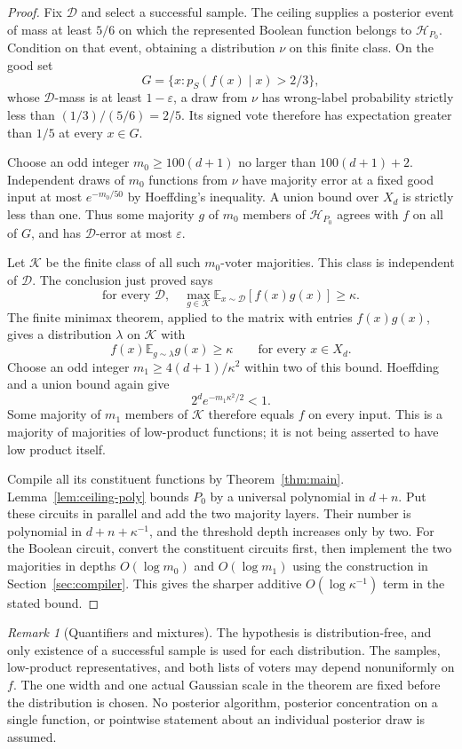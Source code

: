 \documentclass[11pt]{article}
\theoremstyle{remark}
\newtheorem{remark}[theorem]{Remark}
\newcommand{\E}{\mathbb E}
\begin{document}
\begin{proof}
Fix $\mathcal D$ and select a successful sample. The ceiling supplies
a posterior event of mass at least $5/6$ on which the represented
Boolean function belongs to $\mathcal H_{P_0}$. Condition on that
event, obtaining a distribution $\nu$ on this finite class. On the
good set
\[
 G=\{x:p_S(f(x)\mid x)>2/3\},
\]
whose $\mathcal D$-mass is at least $1-\varepsilon$, a draw from
$\nu$ has wrong-label probability strictly less than
$(1/3)/(5/6)=2/5$. Its signed vote therefore has expectation greater
than $1/5$ at every $x\in G$.

Choose an odd integer $m_0\ge100(d+1)$ no larger than $100(d+1)+2$.
Independent draws of $m_0$ functions from $\nu$ have majority error
at a fixed good input at most $e^{-m_0/50}$ by Hoeffding's inequality.
A union bound over $X_d$ is strictly less than one. Thus some majority
$g$ of $m_0$ members of $\mathcal H_{P_0}$ agrees with $f$ on all of
$G$, and has $\mathcal D$-error at most $\varepsilon$.

Let $\mathcal K$ be the finite class of all such $m_0$-voter
majorities. This class is independent of $\mathcal D$. The conclusion
just proved says
\[
 \text{for every }\mathcal D,\quad
 \max_{g\in\mathcal K}\E_{x\sim\mathcal D}[f(x)g(x)]\ge\kappa.
\]
The finite minimax theorem, applied to the matrix with entries
$f(x)g(x)$, gives a distribution $\lambda$ on $\mathcal K$ with
\[
 f(x)\E_{g\sim\lambda}g(x)\ge\kappa
 \qquad\text{for every }x\in X_d.
\]
Choose an odd integer $m_1\ge4(d+1)/\kappa^2$ within two of this
bound. Hoeffding and a union bound again give
\[
 2^d e^{-m_1\kappa^2/2}<1.
\]
Some majority of $m_1$ members of $\mathcal K$ therefore equals $f$
on every input. This is a majority of majorities of low-product
functions; it is not being asserted to have low product itself.

Compile all its constituent functions by Theorem~\ref{thm:main}.
Lemma~\ref{lem:ceiling-poly} bounds $P_0$ by a universal polynomial
in $d+n$. Put these circuits in parallel and add the two majority
layers. Their number is polynomial in $d+n+\kappa^{-1}$, and the
threshold depth increases only by two. For the Boolean circuit,
convert the constituent circuits first, then implement the two
majorities in depths $O(\log m_0)$ and $O(\log m_1)$ using the
construction in Section~\ref{sec:compiler}. This gives the sharper
additive $O(\log\kappa^{-1})$ term in the stated bound.
\end{proof}

\begin{remark}[Quantifiers and mixtures]
The hypothesis is distribution-free, and only existence of a
successful sample is used for each distribution. The samples, low-product
representatives, and both lists of voters may depend nonuniformly on
$f$. The one width and one actual Gaussian scale in the theorem are
fixed before the distribution is chosen. No posterior algorithm,
posterior concentration on a single function, or pointwise statement
about an individual posterior draw is assumed.
\end{remark}
\end{document}
